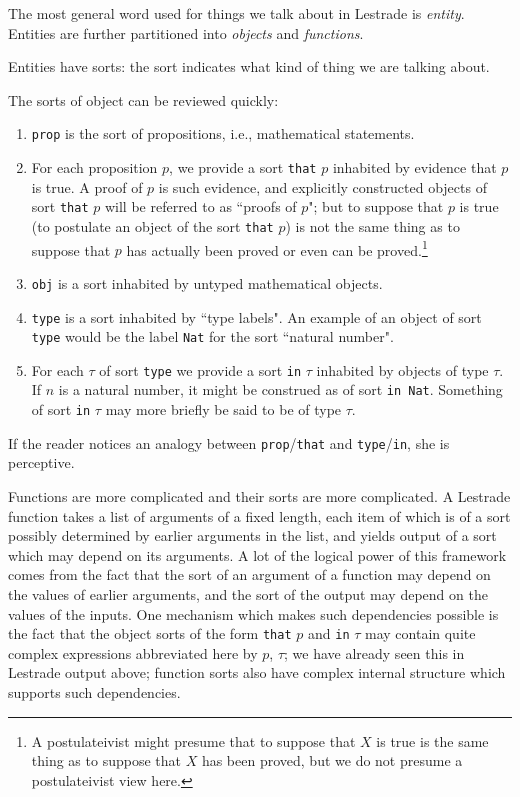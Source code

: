 \documentclass[12pt]{article}
\begin{document}
The most general word used for things we talk about in Lestrade is {\em entity\/}.  Entities are further partitioned into {\em objects} and {\em functions}.

Entities have sorts:  the sort indicates what kind of thing we are talking about.  

The sorts of object can be reviewed quickly:

\begin{enumerate}

\item {\tt prop} is the sort of propositions, i.e., mathematical statements.

\item For each proposition $p$, we provide a sort {\tt that} $p$ inhabited by evidence that $p$ is true.  A proof of $p$ is such evidence, and explicitly constructed objects of sort {\tt that} $p$ will be referred to as ``proofs of $p$";  but to suppose that $p$ is true (to postulate an object of the sort {\tt that} $p$) is not the same thing as to suppose that $p$ has actually been proved or even can be proved.\footnote{A postulateivist might presume that to suppose that $X$ is true is the same thing as to suppose that $X$ has been proved, but we do not presume a postulateivist view here.}

\item {\tt obj} is a sort inhabited by untyped mathematical objects.

\item {\tt type} is a sort inhabited by ``type labels".  An example of an object of sort {\tt type} would be the label {\tt Nat} for the sort ``natural number".

\item For each $\tau$ of sort {\tt type} we provide a sort {\tt in} $\tau$ inhabited by objects of type $\tau$.  If $n$ is a natural number, it might be construed as of sort {\tt in Nat}.  Something of sort {\tt in} $\tau$ may more briefly be said to be of type $\tau$.

\end{enumerate}

If the reader notices an analogy between {\tt prop}/{\tt that} and {\tt type}/{\tt in}, she is perceptive.

Functions are more complicated and their sorts are more complicated.  A Lestrade function takes a list of arguments of a fixed length, each item of which is of a sort possibly determined by earlier arguments in the list, and yields output of a sort which may depend on its arguments.  A lot of the logical power of this framework comes from the fact that the sort of an argument of a function may depend on the values of earlier arguments, and the sort of the output may depend on the values of the inputs.  One mechanism which makes such dependencies possible is the fact that the object sorts of the form {\tt that} $p$ and {\tt in} $\tau$ may contain quite complex expressions abbreviated here by $p$, $\tau$;  we have already seen this in Lestrade output above;  function sorts also have complex internal structure which supports such dependencies.
\end{document}
